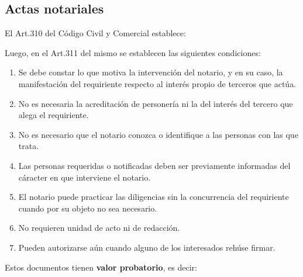 \documentclass[../resumen.tex]{subfiles}
\begin{document}
\subsection{Actas notariales}

El Art.310 del Código Civil y Comercial establece:

\space{0.3cm}
\begin{center}
\end{center}
\vspace{0.3cm}

Luego, en el Art.311 del mismo se establecen las siguientes condiciones:

\begin{enumerate}
  \item Se debe constar lo que motiva la intervención del notario, y en su caso,
    la manifestación del requiriente respecto al interés propio de terceros
    que actúa. 
  \item No es necesaria la acreditación de personería ni la del interés del 
    tercero que alega el requiriente.
  \item No es necesario que el notario conozca o identifique a las personas con 
    las que trata.
  \item Las personas requeridas o notificadas deben ser previamente informadas 
    del cáracter en que interviene el notario.
  \item El notario puede practicar las diligencias sin la concurrencia del
    requiriente cuando por su objeto no sea necesario.
  \item No requieren unidad de acto ni de redacción.
  \item Pueden autorizarse aún cuando alguno de los interesados rehúse firmar.
\end{enumerate}

Estos documentos tienen \textbf{valor probatorio}, es decir:

\begin{center}
\end{center}
\vspace{0.3cm}
\end{document}
